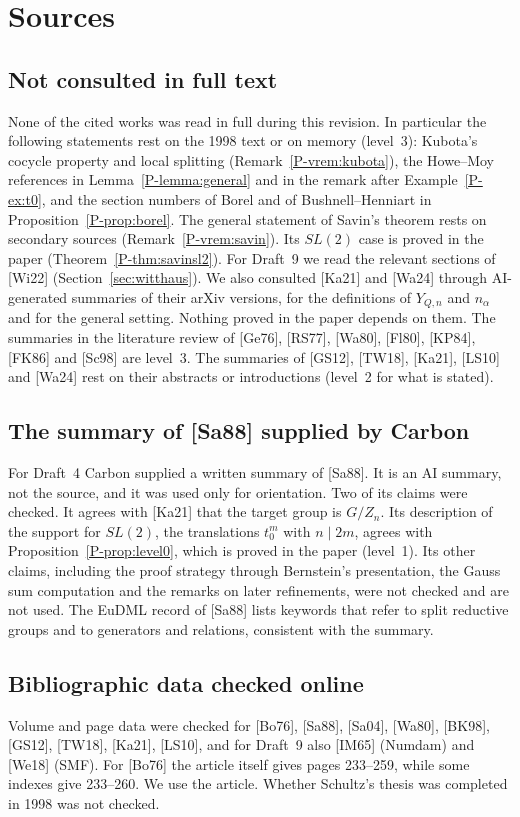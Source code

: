 \documentclass[12pt,letterpaper]{amsart}
\begin{document}
\section{Sources}
\label{sec:sources}

\subsection*{Not consulted in full text}
None of the cited works was read in full during this revision. In
particular the following statements rest on the 1998 text or on memory
(level~3): Kubota's cocycle property and local splitting
(Remark~\ref{P-vrem:kubota}), the Howe--Moy references in
Lemma~\ref{P-lemma:general} and in the remark after
Example~\ref{P-ex:t0}, and the section numbers of Borel and of
Bushnell--Henniart in Proposition~\ref{P-prop:borel}. The general statement of
Savin's theorem rests on secondary sources
(Remark~\ref{P-vrem:savin}). Its $SL(2)$ case is proved in the paper
(Theorem~\ref{P-thm:savinsl2}). For Draft~9 we read the relevant
sections of [Wi22] (Section~\ref{sec:witthaus}). We also consulted
[Ka21] and [Wa24] through AI-generated summaries of their arXiv
versions, for the definitions of $Y_{Q,n}$ and $n_\alpha$ and for the
general setting. Nothing proved in the paper depends on them. The summaries in the literature review of
[Ge76], [RS77], [Wa80], [Fl80], [KP84], [FK86] and [Sc98] are level~3.
The summaries of [GS12], [TW18], [Ka21], [LS10] and [Wa24] rest on
their abstracts or introductions (level~2 for what is stated).

\subsection*{The summary of [Sa88] supplied by Carbon}
For Draft~4 Carbon supplied a written summary of [Sa88]. It is an AI
summary, not the source, and it was used only for orientation. Two of
its claims were checked. It agrees with [Ka21] that the target group
is $G/Z_n$. Its description of the support for $SL(2)$, the translations
$t_0^m$ with $n\mid 2m$, agrees with Proposition~\ref{P-prop:level0},
which is proved in the paper (level~1). Its other claims, including the
proof strategy through Bernstein's presentation, the Gauss sum
computation and the remarks on later refinements, were not checked and
are not used. The EuDML record of [Sa88] lists keywords that refer to
split reductive groups and to generators and relations, consistent
with the summary.

\subsection*{Bibliographic data checked online}
Volume and page data were checked for [Bo76], [Sa88], [Sa04], [Wa80],
[BK98], [GS12], [TW18], [Ka21], [LS10], and for Draft~9 also [IM65]
(Numdam) and [We18] (SMF). For [Bo76] the article itself
gives pages 233--259, while some indexes give 233--260. We use the
article. Whether Schultz's thesis was completed in 1998 was not checked.
\end{document}
